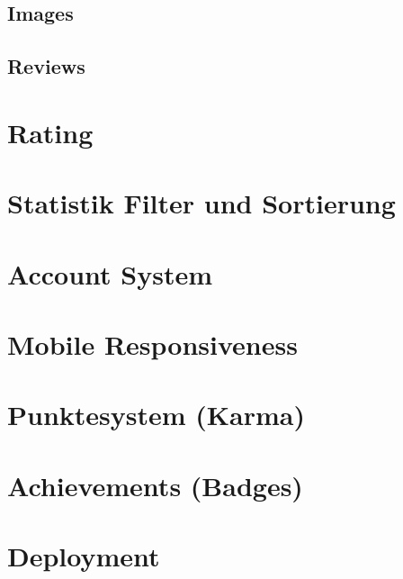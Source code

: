 \subsection{Images} \label{spez:Images}
\subsection{Reviews} \label{spez:Reviews}
\section{Rating} \label{spez:Rating}
\section{Statistik Filter und Sortierung} \label{spez:Statistik}
\section{Account System} \label{spez:Account}
\section{Mobile Responsiveness} \label{spez:Mobile}
\section{Punktesystem (Karma)} \label{spez:Karma}
\section{Achievements (Badges)} \label{spez:Badges}
\section{Deployment} \label{spez:Deployment}
